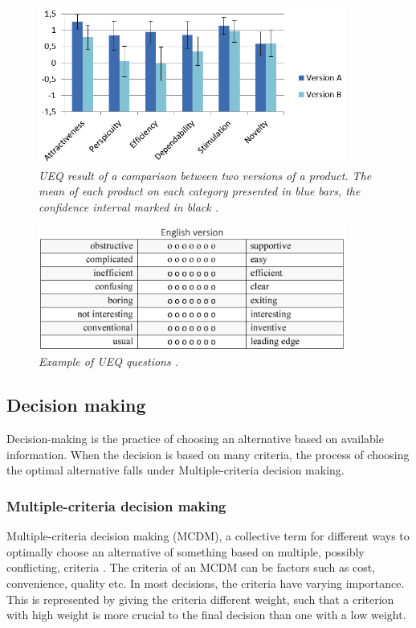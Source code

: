 \begin{figure}[ht]
    \centering 
    \includegraphics[width=0.9\textwidth]{img/comparative_test_ueq.png}
    \hfill
    \caption{\textit{UEQ result of a comparison between two versions of a product. The mean of each product on each category presented in blue bars, the confidence interval marked in black \cite{SchreppHinderksYhomaschewski2014}. }}
    \label{fig:UEQExampleResult}
\end{figure}

\begin{figure}[ht] 
    \centering 
    \includegraphics[width=0.9\textwidth]{img/ueq_questions_example.png}
    \hfill
    \caption{\textit{ Example of UEQ questions \cite{UEQOnline}. }}
    \label{fig:UEQExample}
\end{figure}

\newpage


\subsection{Decision making}

Decision-making is the practice of choosing an alternative based on available information. 
When the decision is based on many criteria, the process of choosing the optimal alternative falls under Multiple-criteria decision making.

\subsubsection{Multiple-criteria decision making}
Multiple-criteria decision making (MCDM), a collective term for different ways to optimally choose an alternative of something based on multiple, possibly conflicting, criteria \cite{MCDA}. 
The criteria of an MCDM can be factors such as cost, convenience, quality etc. In most decisions, the criteria have varying importance. 
This is represented by giving the criteria different weight, such that a criterion with high weight is more crucial to the final decision than one with a low weight. 

